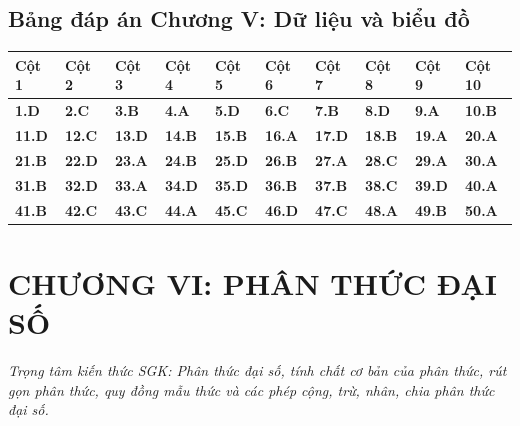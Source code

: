 \documentclass[11pt,a4paper]{article}
\begin{document}
\subsection*{\color{primary} Bảng đáp án Chương V: Dữ liệu và biểu đồ}
\begin{center}
\renewcommand{\arraystretch}{1.25}
\begin{tabularx}{\textwidth}{*{10}{>{\centering\arraybackslash}X}}
\toprule
\textbf{\color{primary} Cột 1} & \textbf{\color{primary} Cột 2} & \textbf{\color{primary} Cột 3} & \textbf{\color{primary} Cột 4} & \textbf{\color{primary} Cột 5} & \textbf{\color{primary} Cột 6} & \textbf{\color{primary} Cột 7} & \textbf{\color{primary} Cột 8} & \textbf{\color{primary} Cột 9} & \textbf{\color{primary} Cột 10} \\
\midrule
\textbf{1.D} & \textbf{2.C} & \textbf{3.B} & \textbf{4.A} & \textbf{5.D} & \textbf{6.C} & \textbf{7.B} & \textbf{8.D} & \textbf{9.A} & \textbf{10.B} \\
\rowcolor{rowtint} \textbf{11.D} & \textbf{12.C} & \textbf{13.D} & \textbf{14.B} & \textbf{15.B} & \textbf{16.A} & \textbf{17.D} & \textbf{18.B} & \textbf{19.A} & \textbf{20.A} \\
\textbf{21.B} & \textbf{22.D} & \textbf{23.A} & \textbf{24.B} & \textbf{25.D} & \textbf{26.B} & \textbf{27.A} & \textbf{28.C} & \textbf{29.A} & \textbf{30.A} \\
\rowcolor{rowtint} \textbf{31.B} & \textbf{32.D} & \textbf{33.A} & \textbf{34.D} & \textbf{35.D} & \textbf{36.B} & \textbf{37.B} & \textbf{38.C} & \textbf{39.D} & \textbf{40.A} \\
\textbf{41.B} & \textbf{42.C} & \textbf{43.C} & \textbf{44.A} & \textbf{45.C} & \textbf{46.D} & \textbf{47.C} & \textbf{48.A} & \textbf{49.B} & \textbf{50.A} \\
\bottomrule
\end{tabularx}
\end{center}\vspace{10pt}
\section*{\color{primary} CHƯƠNG VI: PHÂN THỨC ĐẠI SỐ}
\textit{Trọng tâm kiến thức SGK: Phân thức đại số, tính chất cơ bản của phân thức, rút gọn phân thức, quy đồng mẫu thức và các phép cộng, trừ, nhân, chia phân thức đại số.}\par\vspace{4pt}
\end{document}
